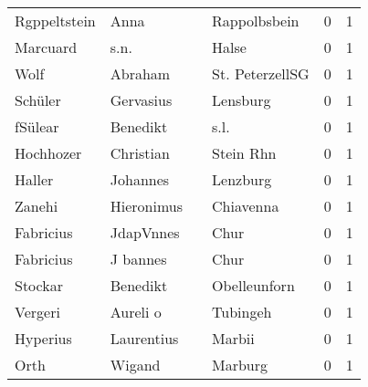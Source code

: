 \begin{tabular}{llllrr}
             Rgppeltstein &                               Anna &             &                                Rappolbsbein &          0 &         1 \\
                 Marcuard &                               s.n. &             &                                       Halse &          0 &         1 \\
                     Wolf &                            Abraham &             &                             St. PeterzellSG &          0 &         1 \\
                  Schüler &                          Gervasius &             &                                    Lensburg &          0 &         1 \\
                  fSülear &                           Benedikt &             &                                        s.l. &          0 &         1 \\
                Hochhozer &                          Christian &             &                                   Stein Rhn &          0 &         1 \\
                   Haller &                           Johannes &             &                                    Lenzburg &          0 &         1 \\
                   Zanehi &                         Hieronimus &             &                                   Chiavenna &          0 &         1 \\
                Fabricius &                          JdapVnnes &             &                                        Chur &          0 &         1 \\
                Fabricius &                           J bannes &             &                                        Chur &          0 &         1 \\
                  Stockar &                           Benedikt &             &                                Obelleunforn &          0 &         1 \\
                  Vergeri &                           Aureli o &             &                                    Tubingeh &          0 &         1 \\
                 Hyperius &                         Laurentius &             &                                      Marbii &          0 &         1 \\
                     Orth &                             Wigand &             &                                     Marburg &          0 &         1 \\

\end{tabular}
